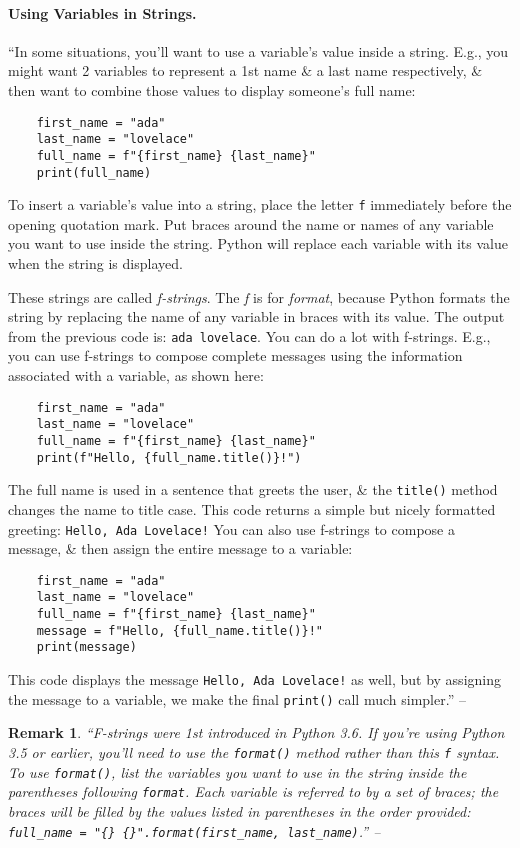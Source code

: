 \documentclass[oneside]{book}
\numberwithin{equation}{section}
\newtheorem{remark}{Remark}[chapter]
\begin{document}
\paragraph{Using Variables in Strings.} ``In some situations, you'll want to use a variable's value inside a string. E.g., you might want 2 variables to represent a 1st name \& a last name respectively, \& then want to combine those values to display someone's full name:
\begin{verbatim}
	first_name = "ada"
	last_name = "lovelace"
	full_name = f"{first_name} {last_name}"
	print(full_name)
\end{verbatim}
To insert a variable's value into a string, place the letter \texttt{f} immediately before the opening quotation mark. Put braces around the name or names of any variable you want to use inside the string. Python will replace each variable with its value when the string is displayed.

These strings are called \textit{f-strings}. The \textit{f} is for \textit{format}, because Python formats the string by replacing the name of any variable in braces with its value. The output from the previous code is: \texttt{ada lovelace}. You can do a lot with f-strings. E.g., you can use f-strings to compose complete messages using the information associated with a variable, as shown here:
\begin{verbatim}
	first_name = "ada"
	last_name = "lovelace"
	full_name = f"{first_name} {last_name}"
	print(f"Hello, {full_name.title()}!")
\end{verbatim}
The full name is used in a sentence that greets the user, \& the \texttt{title()} method changes the name to title case. This code returns a simple but nicely formatted greeting: \texttt{Hello, Ada Lovelace!} You can also use f-strings to compose a message, \& then assign the entire message to a variable:
\begin{verbatim}
	first_name = "ada"
	last_name = "lovelace"
	full_name = f"{first_name} {last_name}"
	message = f"Hello, {full_name.title()}!"
	print(message)
\end{verbatim}
This code displays the message \texttt{Hello, Ada Lovelace!} as well, but by assigning the message to a variable, we make the final \texttt{print()} call much simpler.'' -- \cite[p. 21]{Matthes2019}

\begin{remark}
	``F-strings were 1st introduced in Python 3.6. If you're using Python 3.5 or earlier, you'll need to use the \texttt{format()} method rather than this \texttt{f} syntax. To use \texttt{format()}, list the variables you want to use in the string inside the parentheses following \texttt{format}. Each variable is referred to by a set of braces; the braces will be filled by the values listed in parentheses in the order provided: \verb|full_name = "{} {}".format(first_name, last_name)|.'' -- \cite[p. 22]{Matthes2019}
\end{remark}
\end{document}

